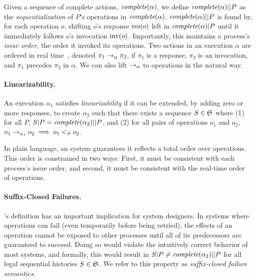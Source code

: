 Given a sequence of complete actions,
$\operatorname*{\textit{complete}}(\alpha)$, we define $\operatorname*{\textit{complete}}(\alpha)||P$ as the
\textit{sequentialization} of $P$'s operations in $\operatorname*{\textit{complete}}(\alpha)$.
$\operatorname*{\textit{complete}}(\alpha)||P$ is found by, for each operation $o$, shifting $o$'s response
$\operatorname{res}(o)$ left in $\operatorname*{\textit{complete}}(\alpha)|P$ until it immediately follows $o$'s
invocation $\operatorname{inv}(o)$.
Importantly, this maintains a process's
\textit{issue order}, the order it invoked its operations.
%
Two actions in an execution $\alpha$ are
ordered in real time~\cite{herlihy1990linearizability}, denoted
$\pi_1 \rightarrow_\alpha \pi_2$, if $\pi_1$ is a response, $\pi_2$ is an
invocation, and $\pi_1$ precedes $\pi_2$ in $\alpha$.
We can also lift $\rightarrow_\alpha$ to operations in the natural
way.

\paragraph{\Multidispatch{} Linearizability.} An execution $\alpha_1$ satisfies \textit{\multidispatch{} linearizability} if it
can be extended, by adding zero or more responses, to create $\alpha_2$ such that
there exists a sequence $S \in \mathfrak{S}$ where (1) for all $P$,
$S|P = \operatorname*{\textit{complete}}(\alpha_2)||P$, and (2) for all pairs of operations
$o_1$ and $o_2$, $o_1 \rightarrow_{\alpha_1} o_2 \implies o_1 <_S o_2$.

In plain language, an \MDL{} system guarantees it reflects a total order 
over operations. This order is constrained in two ways: First,
it must be consistent with each process's issue order, and second, 
it must be consistent with the real-time order of operations.

\paragraph{Suffix-Closed Failures.}
\label{sec:mdl:def:failures}

\MDL{}'s definition has an important implication for system designers.
In systems where operations can fail (even temporarily before being retried), the
effects of an operation cannot be exposed to other processes until all of its 
predecessors are guaranteed to succeed. Doing so would violate the intuitively
correct behavior of most systems, and formally, this would result in
$S|P \neq \operatorname*{\textit{complete}}(\alpha_2)||P$ for all legal sequential histories
$S \in \mathfrak{S}$.
We refer to this property as \textit{suffix-closed failure semantics}.



